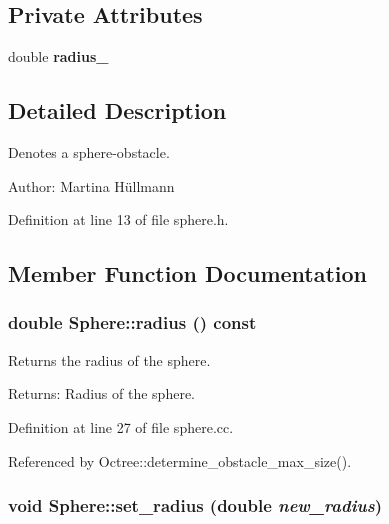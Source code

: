 \subsection*{Private Attributes}
\begin{CompactItemize}
\item 
\hypertarget{class_sphere_e5bc6962474cb1fb220b7aa956257554}{
double \textbf{radius\_\-}}
\label{class_sphere_e5bc6962474cb1fb220b7aa956257554}

\end{CompactItemize}


\subsection{Detailed Description}
Denotes a sphere-obstacle. 

\begin{Desc}
\item[Author:]Martina Hüllmann \end{Desc}


Definition at line 13 of file sphere.h.

\subsection{Member Function Documentation}
\hypertarget{class_sphere_82c3e6746f79196c744b46f39569689e}{
\subsubsection[radius]{\setlength{\rightskip}{0pt plus 5cm}double Sphere::radius () const}}
\label{class_sphere_82c3e6746f79196c744b46f39569689e}


Returns the radius of the sphere. \begin{Desc}
\item[Returns:]Radius of the sphere. \end{Desc}


Definition at line 27 of file sphere.cc.

Referenced by Octree::determine\_\-obstacle\_\-max\_\-size().\hypertarget{class_sphere_67b1c1595ffd2c0dcf8abfeca8de5c36}{
\subsubsection[set\_\-radius]{\setlength{\rightskip}{0pt plus 5cm}void Sphere::set\_\-radius (double {\em new\_\-radius})}}
\label{class_sphere_67b1c1595ffd2c0dcf8abfeca8de5c36}


